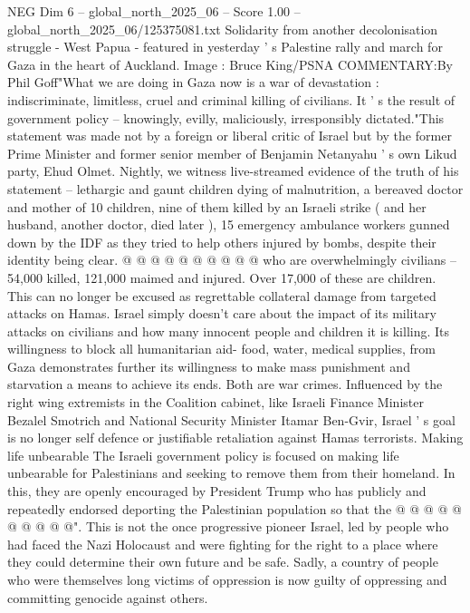 \begin{textsample}{NEG Dim 6 – global\_north\_2025\_06 – Score 1.00 – global\_north\_2025\_06/125375081.txt}  \label{ex:f6_neg_418}
Solidarity from another decolonisation struggle - West Papua - featured in yesterday ' s Palestine rally and march for Gaza in the heart of Auckland.
Image : Bruce King/PSNA COMMENTARY:By Phil Goff"What we are doing in Gaza now is a war of devastation : indiscriminate, limitless, cruel and criminal killing of civilians.
It ' s the result of government policy -- knowingly, evilly, maliciously, irresponsibly dictated."This statement was made not by a foreign or liberal critic of Israel but by the former Prime Minister and former senior member of Benjamin Netanyahu ' s own Likud party, Ehud Olmet.
Nightly, we witness live-streamed evidence of the truth of his statement -- lethargic and gaunt children dying of malnutrition, a bereaved doctor and mother of 10 children, nine of them killed by an Israeli strike ( and her husband, another doctor, died later ), 15 emergency ambulance workers gunned down by the IDF as they tried to help others injured by bombs, despite their identity being clear. @ @ @ @ @ @ @ @ @ @ who are overwhelmingly civilians -- 54,000 killed, 121,000 maimed and injured.
Over 17,000 of these are children.
This can no longer be excused as regrettable collateral damage from targeted attacks on Hamas.
Israel simply doesn't care about the impact of its military attacks on civilians and how many innocent people and children it is killing.
Its willingness to block all humanitarian aid- food, water, medical supplies, from Gaza demonstrates further its willingness to make mass punishment and starvation a means to achieve its ends.
Both are war crimes.
Influenced by the right wing extremists in the Coalition cabinet, like Israeli Finance Minister Bezalel Smotrich and National Security Minister Itamar Ben-Gvir, Israel ' s goal is no longer self defence or justifiable retaliation against Hamas terrorists.
Making life unbearable The Israeli government policy is focused on making life unbearable for Palestinians and seeking to remove them from their homeland.
In this, they are openly encouraged by President Trump who has publicly and repeatedly endorsed deporting the Palestinian population so that the @ @ @ @ @ @ @ @ @ @".
This is not the once progressive pioneer Israel, led by people who had faced the Nazi Holocaust and were fighting for the right to a place where they could determine their own future and be safe.
Sadly, a country of people who were themselves long victims of oppression is now guilty of oppressing and committing genocide against others.

\end{textsample}
